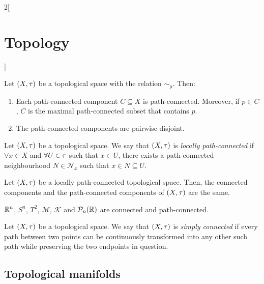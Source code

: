 \documentclass[../../../main.tex]{subfiles}
\begin{document}
\begin{multicols}{2}[\section{Topology}]
  \begin{proposition}
    Let $(X,\tau)$ be a topological space with the relation $\sim_\text{p}$. Then:
    \begin{enumerate}
      \item Each path-connected component $C\subseteq X$ is path-connected. Moreover, if $p\in C$, $C$ is the maximal path-connected subset that contains $p$.
      \item The path-connected components are pairwise disjoint.
    \end{enumerate}
  \end{proposition}
  \begin{definition}
    Let $(X,\tau)$ be a topological space. We say that $(X,\tau)$ is \emph{locally path-connected} if $\forall x\in X$ and $\forall U\in\tau$ such that $x\in U$, there exists a path-connected neighbourhood $N\in\mathcal{N}_x$ such that $x\in N\subseteq U$.
  \end{definition}
  \begin{theorem}
    Let $(X,\tau)$ be a locally path-connected topological space. Then, the connected components and the path-connected components of $(X,\tau)$ are the same.
  \end{theorem}
  \begin{proposition}
    $\mathbb{R}^n$, $S^n$, $T^2$, $\mathcal{M}$, $\mathcal{K}$ and $\mathcal{P}_n(\mathbb{R})$ are connected and path-connected.
  \end{proposition}
  \begin{definition}
    Let $(X,\tau)$ be a topological space. We say that $(X,\tau)$ is \emph{simply connected} if every path between two points can be continuously transformed into any other such path while preserving the two endpoints in question.
  \end{definition}
  \subsection{Topological manifolds}

\end{multicols}
\end{document}
